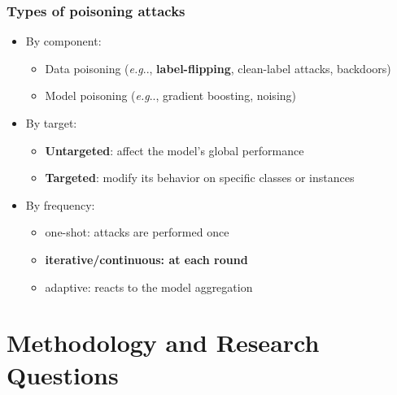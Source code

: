 \documentclass[color,t,presentation,english,aspectratio=169]{beamer}
\makeatletter
\DeclareRobustCommand\onedot{\futurelet\@let@token\@onedot}
\def\@onedot{\ifx\@let@token.\else.\null\fi\xspace}
\def\eg{\emph{e.g}\onedot} \def\Eg{\emph{E.g}\onedot}
\makeatother
\begin{document}
\begin{frame}
	\frametitle{Types of poisoning attacks}

	\begin{overlayarea}{\textwidth}{.7\textheight}
		\begin{itemize}
			\item By component:
			\begin{itemize}
				\item Data poisoning (\eg, \textbf<2>{label-flipping}, clean-label attacks, backdoors)
				\item Model poisoning (\eg, gradient boosting, noising)
			\end{itemize}
			\item By target:
			\begin{itemize}
				\item \textbf<2>{Untargeted}: affect the model's global performance
				\item \textbf<2>{Targeted}: modify its behavior on specific classes or instances
			\end{itemize}
			\item By frequency:
			\begin{itemize}
				\item one-shot: attacks are performed once
				\item \textbf<2>{iterative/continuous: at each round}
				\item adaptive: reacts to the model aggregation
			\end{itemize}
		\end{itemize}
	\end{overlayarea}
	\centering

\end{frame}

\tableofcontentsimtatlantique

\section{Methodology and Research Questions}
\end{document}

